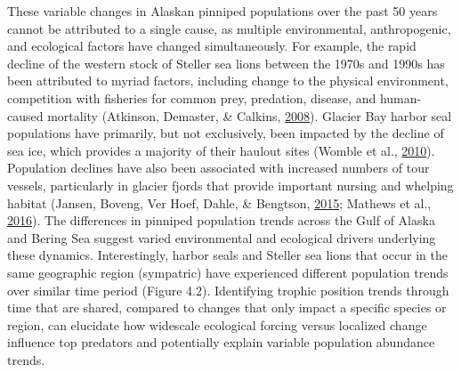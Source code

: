 \documentclass [11pt, proquest] {uwthesis}[2015/03/03]
\begin{document}
These variable changes in Alaskan pinniped populations over the past 50
years cannot be attributed to a single cause, as multiple environmental,
anthropogenic, and ecological factors have changed simultaneously. For
example, the rapid decline of the western stock of Steller sea lions
between the 1970s and 1990s has been attributed to myriad factors,
including change to the physical environment, competition with fisheries
for common prey, predation, disease, and human-caused mortality
(Atkinson, Demaster, \& Calkins,
\protect\hyperlink{ref-Atkinson2008}{2008}). Glacier Bay harbor seal
populations have primarily, but not exclusively, been impacted by the
decline of sea ice, which provides a majority of their haulout sites
(Womble et al., \protect\hyperlink{ref-Womble2010}{2010}). Population
declines have also been associated with increased numbers of tour
vessels, particularly in glacier fjords that provide important nursing
and whelping habitat (Jansen, Boveng, Ver Hoef, Dahle, \& Bengtson,
\protect\hyperlink{ref-Jansen2015}{2015}; Mathews et al.,
\protect\hyperlink{ref-Mathews2016}{2016}). The differences in pinniped
population trends across the Gulf of Alaska and Bering Sea suggest
varied environmental and ecological drivers underlying these dynamics.
Interestingly, harbor seals and Steller sea lions that occur in the same
geographic region (sympatric) have experienced different population
trends over similar time period (Figure 4.2). Identifying trophic
position trends through time that are shared, compared to changes that
only impact a specific species or region, can elucidate how widescale
ecological forcing versus localized change influence top predators and
potentially explain variable population abundance trends.
\end{document}
